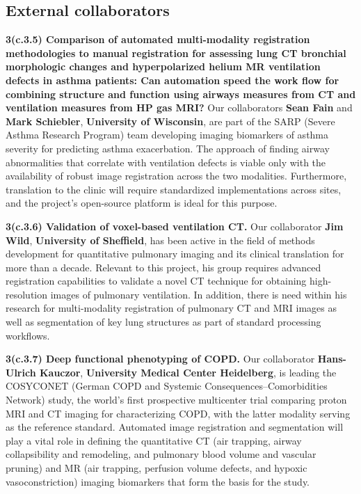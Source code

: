 \documentclass[11pt,]{article}
\begin{document}
\subsection{External collaborators}\label{external-collaborators}

\textbf{3(c.3.5) Comparison of automated multi-modality registration
methodologies to manual registration for assessing lung CT bronchial
morphologic changes and hyperpolarized helium MR ventilation defects in
asthma patients: Can automation speed the work flow for combining
structure and function using airways measures from CT and ventilation
measures from HP gas MRI?} Our collaborators \textbf{Sean Fain} and
\textbf{Mark Schiebler}, \textbf{University of Wisconsin}, are part of
the SARP (Severe Asthma Research Program) team developing imaging
biomarkers of asthma severity for predicting asthma exacerbation. The
approach of finding airway abnormalities that correlate with ventilation
defects is viable only with the availability of robust image
registration across the two modalities. Furthermore, translation to the
clinic will require standardized implementations across sites, and the
project's open-source platform is ideal for this purpose.

\textbf{3(c.3.6) Validation of voxel-based ventilation CT.} Our
collaborator \textbf{Jim Wild}, \textbf{University of Sheffield}, has
been active in the field of methods development for quantitative
pulmonary imaging and its clinical translation for more than a decade.
Relevant to this project, his group requires advanced registration
capabilities to validate a novel CT technique for obtaining
high-resolution images of pulmonary ventilation. In addition, there is
need within his research for multi-modality registration of pulmonary CT
and MRI images as well as segmentation of key lung structures as part of
standard processing workflows.

\textbf{3(c.3.7) Deep functional phenotyping of COPD.} Our collaborator
\textbf{Hans-Ulrich Kauczor}, \textbf{University Medical Center
Heidelberg}, is leading the COSYCONET (German COPD and Systemic
Consequences--Comorbidities Network) study, the world's first
prospective multicenter trial comparing proton MRI and CT imaging for
characterizing COPD, with the latter modality serving as the reference
standard. Automated image registration and segmentation will play a
vital role in defining the quantitative CT (air trapping, airway
collapsibility and remodeling, and pulmonary blood volume and vascular
pruning) and MR (air trapping, perfusion volume defects, and hypoxic
vasoconstriction) imaging biomarkers that form the basis for the study.
\end{document}
